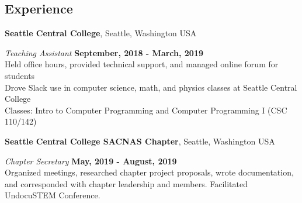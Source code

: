\documentclass[margin,line]{res}
\newenvironment{list2}{
  \begin{list}{$\bullet$}{%
      \setlength{\itemsep}{0in}
      \setlength{\parsep}{0in} \setlength{\parskip}{0in}
      \setlength{\topsep}{0in} \setlength{\partopsep}{0in} 
      \setlength{\leftmargin}{0.2in}}}{\end{list}}
\begin{document}
\begin{resume}
\vspace{-.3cm}
\section{\sc Experience}


{\bf Seattle Central College}, Seattle, Washington USA

\vspace{-.3cm}
{\em Teaching Assistant} \hfill {\bf September, 2018  - March, 2019}\\
Held office hours, provided technical support, and managed online forum for students \\
Drove Slack use in computer science, math, and physics classes at Seattle Central College \\
Classes: Intro to Computer Programming and Computer Programming I (CSC 110/142)






{\bf Seattle Central College SACNAS Chapter}, Seattle, Washington USA

\vspace{-.3cm}
{\em Chapter Secretary} \hfill {\bf May, 2019 - August, 2019}\\
  Organized meetings, researched chapter project proposals, wrote documentation, and 
  corresponded with chapter leadership and members. Facilitated UndocuSTEM Conference.

\end{resume}
\end{document}
